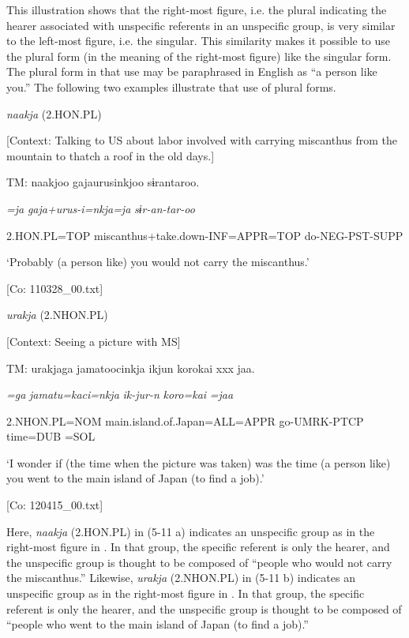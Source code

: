 This illustration shows that the right-most figure, i.e. the plural indicating the hearer associated with unspecific referents in an unspecific group, is very similar to the left-most figure, i.e. the singular. This similarity makes it possible to use the plural form (in the meaning of the right-most figure) like the singular form. The plural form in that use may be paraphrased in English as “a person like you.” The following two examples illustrate that use of plural forms.

\ea \label{ex:5:11}  \ea \label{ex:5:11a} \textit{naakja} (2.HON.PL)

    [Context: Talking to US about labor involved with carrying miscanthus from the mountain to thatch a roof in the old days.]

    TM:  naakjoo  gajaurusinkjoo  sɨrantaroo.

      \textit{=ja}  \textit{gaja+urus-i=nkja=ja} \textit{sɨr-an-tar-oo}
                                                       
      2.HON.PL=TOP  miscanthus+take.down-INF=APPR=TOP  do-NEG-PST-SUPP

      ‘Probably (a person like) you would not carry the miscanthus.’

      [Co: 110328\_00.txt]

 \ex \label{ex:5:b} \textit{urakja} (2.NHON.PL)

    [Context: Seeing a picture with MS]

    TM:  urakjaga  jamatoocinkja  ikjun  {\textbar}koro{\textbar}kai  xxx  jaa.

      \textit{=ga}  \textit{jamatu=kaci=nkja} \textit{ik-jur-n}  \textit{koro=kai}    \textit{=jaa}
                                                   
      2.NHON.PL=NOM  main.island.of.Japan=ALL=APPR  go-UMRK-PTCP  time=DUB    =SOL

      ‘I wonder if (the time when the picture was taken) was the time (a person like) you went to the main island of Japan (to find a job).’

      [Co: 120415\_00.txt]
      \z
      \z

Here, \textit{naakja} (2.HON.PL) in (5-11 a) indicates an unspecific group as in the right-most figure in . In that group, the specific referent is only the hearer, and the unspecific group is thought to be composed of “people who would not carry the miscanthus.” Likewise, \textit{urakja} (2.NHON.PL) in (5-11 b) indicates an unspecific group as in the right-most figure in . In that group, the specific referent is only the hearer, and the unspecific group is thought to be composed of “people who went to the main island of Japan (to find a job).”

